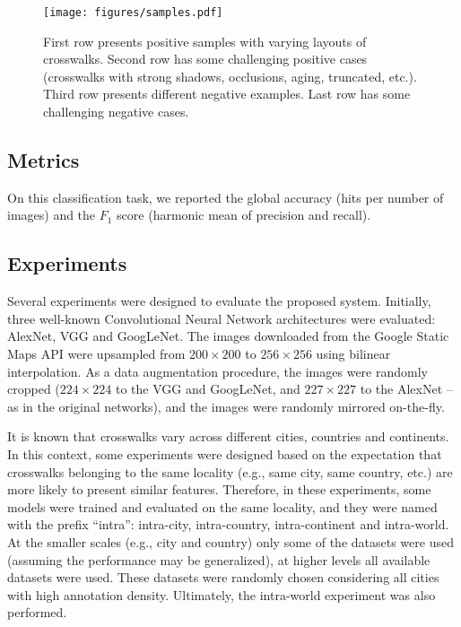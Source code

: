 \documentclass[journal]{IEEEtran}
\newcommand{\GoogleStaticMapsAPI}{Google Static Maps API\xspace}
\begin{document}
\begin{figure}
	\centering
	\texttt{[image: figures/samples.pdf]}
	\caption{First row presents positive samples with varying layouts of crosswalks. Second row has some challenging positive cases (crosswalks with strong shadows, occlusions, aging, truncated, etc.). Third row presents different negative examples. Last row has some challenging negative cases.}
	\label{fig:samples}
\end{figure}

\subsection{Metrics}
On this classification task, we reported the global accuracy (hits per number of images) and the $F_1$ score (harmonic mean of precision and recall).
\iffalse
\begin{gather}
	\text{ACC} = \frac{\mathrm{TP} + \mathrm{TN}}{\mathrm{P} + \mathrm{N}} \label{eq:accuracy} \\
	F_{1} = 2\cdot {\frac {\mathrm {precision} \cdot \mathrm {recall} }{\mathrm {precision} +\mathrm {recall} }} \label{eq:f1_score}
\end{gather}
where TP, TN, P and N means the number of True Positive, True Negative, Positive and Negative, respectively. Precision is defined by $\frac{\mathrm{TP}}{\mathrm{TP} + \mathrm{FP}}$ and recall by $\frac{\mathrm{TP}}{\mathrm{P}}$, where FP means False Positive.
\fi

\subsection{Experiments}

Several experiments were designed to evaluate the proposed system. Initially, three well-known Convolutional Neural Network architectures were evaluated: AlexNet, VGG and GoogLeNet. The images downloaded from the \GoogleStaticMapsAPI were upsampled from $200\times200$ to $256\times256$ using bilinear interpolation. As a data augmentation procedure, the images were randomly cropped ($224\times224$ to the VGG and GoogLeNet, and $227\times227$ to the AlexNet -- as in the original networks), and the images were randomly mirrored on-the-fly.

It is known that crosswalks vary across different cities, countries and continents. In this context, some experiments were designed based on the expectation that crosswalks belonging to the same locality (e.g., same city, same country, etc.) are more likely to present similar features. Therefore, in these experiments, some models were trained and evaluated on the same locality, and they were named with the prefix ``intra'': intra-city, intra-country, intra-continent and intra-world. At the smaller scales (e.g., city and country) only some of the datasets were used (assuming the performance may be generalized), at higher levels all available datasets were used. These datasets were randomly chosen considering all cities with high annotation density. Ultimately, the intra-world experiment was also performed.
\end{document}
